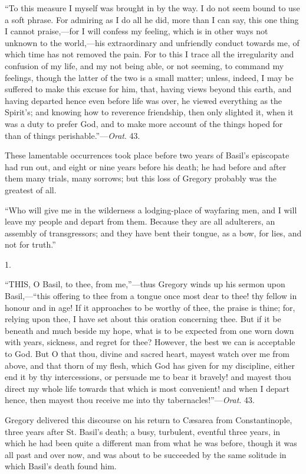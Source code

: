 ``To this measure I myself was brought in by the way. I do not
seem bound to use a soft phrase. For admiring as I do all he did, more
than I can say, this one thing I cannot praise,—for I will confess
my feeling, which is in other ways not unknown to the world,—his
extraordinary and unfriendly conduct towards me, of which time has not
removed the pain. For to this I trace all the irregularity and
confusion of my life, and my not being able, or not seeming, to
command my feelings, though the latter of the two is a small matter;
unless, indeed, I may be suffered to make this excuse for him, that,
having views beyond this earth, and having departed hence even before
life was over, he viewed everything as the Spirit's; and knowing how
to reverence friendship, then only slighted it, when it was a duty to
prefer God, and to make more account of the things hoped for than of
things perishable.''—\emph{Orat}. 43.

These lamentable occurrences took place before two years of Basil's
episcopate had run out, and eight or nine years before his death; he
had before and after them many trials, many sorrows; but this loss of
Gregory probably was the greatest of all.


``Who will give me in the wilderness a lodging-place of
wayfaring men, and I will leave my people and depart from them.
Because they are all adulterers, an assembly of transgressors; and
they have bent their tongue, as a bow, for lies, and not for
truth.''

1.

``THIS, O Basil, to thee, from me,''—thus
Gregory winds up his sermon upon Basil,—``this offering to thee
from a tongue once most dear to thee! thy fellow in honour and in age!
If it approaches to be worthy of thee, the praise is thine; for,
relying upon thee, I have set about this oration concerning thee. But
if it be beneath and much beside my hope, what is to be expected from
one worn down with years, sickness, and regret for thee? However, the
best we can is acceptable to God. But O that thou, divine and sacred
heart, mayest watch over me from above, and that thorn of my flesh,
which God has given for my discipline, either end it by thy
intercessions, or persuade me to bear it bravely! and mayest thou
direct my whole life towards that which is most convenient! and when I
depart hence, then mayest thou receive me into thy tabernacles!''—\emph{Orat}.
43.

Gregory delivered this discourse on his return to Cæsarea from
Constantinople, three years after St. Basil's death; a busy,
turbulent, eventful three years, in which he had been quite a
different man from what he was before, though it was all past and over
now, and was about to be succeeded by the same solitude in which Basil's
death found him.

